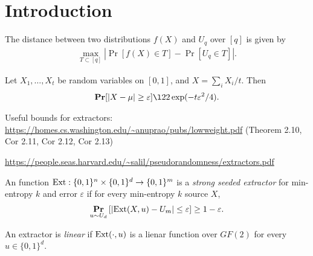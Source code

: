 \section{Introduction}

\begin{definition}
  The distance between two distributions $f(X)$ and $U_q$ over $[q]$ is given by 
  \begin{align}
    \max_{T\subset [q]} |\Pr[f(X)\in T] - \Pr[U_q\in T]|.
    \label{eq:tv}
  \end{align}
\end{definition}
\begin{definition}
  Let $X_1,\dots,X_t$ be random variables on $[0,1]$, and $X=\sum_{i}^{} X_i/t$. Then
  \begin{align}
    \Pr[|X-\mu|\ge \varepsilon]\l2 2\exp(-t\varepsilon^2/4).
    \label{}
  \end{align}
\end{definition}

Useful bounds for extractors: \url{https://homes.cs.washington.edu/~anuprao/pubs/lowweight.pdf} (Theorem 2.10, Cor 2.11, Cor 2.12, Cor 2.13)


\url{https://people.seas.harvard.edu/~salil/pseudorandomness/extractors.pdf}
\begin{definition}
  An function $\textnormal{Ext}:\{0,1\}^n\times \{0,1\}^d\to\{0,1\}^m$ is a \emph{strong seeded extractor} for min-entropy $k$ and error $\varepsilon$ if for every min-entropy $k$ source $X$,
  \begin{align}
    \mathop{\bf Pr\/}_{u\sim U_d}\left[ |\textnormal{Ext}(X,u) - U_m|\le \varepsilon \right]\ge 1-\varepsilon.
    \label{}
  \end{align}

  An extractor is \emph{linear} if $\textnormal{Ext}(\cdot,u)$ is a lienar function over $GF(2)$ for every $u\in\{0,1\}^d$.
\end{definition}

